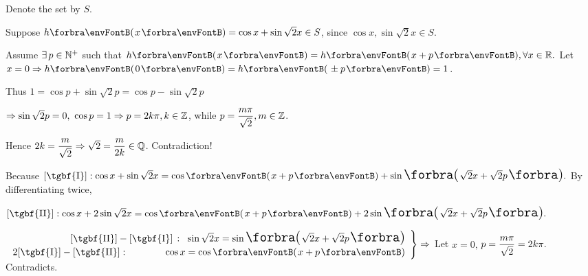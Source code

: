 Denote the set by $S$.\par\quad
Suppose $h\Par{x}=\cos x+\sin \sqrt{2}x\in S$, since $\cos x,\sin \sqrt{2}x\in S$.\par\quad
Assume $\exists\,p\in{\mathbb{N}^+}$ such that $h\Par{x}=h\Par{x+p},\forall x\in\Rbb.$ Let $x=0\Rightarrow h\Par{0}=h\Par{\pm p}=1$.\par\quad
Thus $1=\cos p+\sin \sqrt{2}p=\cos p-\sin\sqrt{2}p$\par\quad
$\Rightarrow\sin\sqrt{2}p=0,\,\,\cos p=1\Rightarrow p=2k\pi,k\in{\mathbb{Z}}$, while $p={\displaystyle{\frac{m\pi}{\sqrt{2}}}},m\in{\mathbb{Z}}$.\par\vspace{-2pt}\quad
Hence $2k={\displaystyle{\frac{m}{\sqrt{2}}}}\Rightarrow \sqrt{2}={\displaystyle{\frac{m}{2k}}}\in{\mathbb{Q}}$. Contradiction!\PfEnd\vspace{10pt}\par\quad
\Or Because $[\text{\tgbf{I}}]: \cos x+\sin\sqrt{2}x=\cos\Par{x+p}+\sin\envFontLarge\BigPar{\sqrt{2}x+\sqrt{2}p}.$ By differentiating twice,\par\vspace{2pt}\qquad\qquad\qquad\hspace{0pt}
$[\text{\tgbf{II}}]: \cos x+2\sin\sqrt{2}x=\cos\Par{x+p}+2\envFontLarge\sin\BigPar{\sqrt{2}x+\sqrt{2}p}.$\par\vspace{6pt}\quad
$\MathRightBrace{r}{
	[\text{\tgbf{II}}]-[\text{\tgbf{I}}]\,:\;\;\sin\sqrt{2}x=\sin{\envFontLarge\BigPar{\sqrt{2}x+\sqrt{2}p}}\vspace{2pt}\\ 
	2[\text{\tgbf{I}}]-[\text{\tgbf{II}}]:\qquad\qquad\hspace{-1pt} \cos x=\cos\Par{x+p}}\Rightarrow$ Let $x=0,$\;\,$ p={\displaystyle{\frac{m\pi}{\sqrt{2}}}}=2k\pi.$\; Contradicts.\PfEnd\vspace{4pt}\par
\SepLine[6pt]

\BulletPointX{}\par
{} \quad {}\PfEnd
{}\PfEnd
{}\PfEnd
\SepLine



